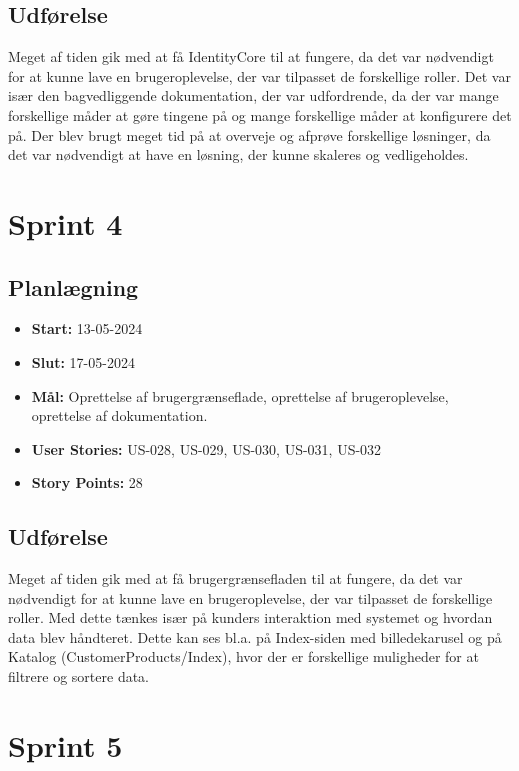 \subsection{Udførelse}
\label{subsec:sprint-3-udforelse}
Meget af tiden gik med at få IdentityCore til at fungere, da det var nødvendigt for at kunne lave en brugeroplevelse, der var tilpasset de forskellige roller.
Det var især den bagvedliggende dokumentation, der var udfordrende, da der var mange forskellige måder at gøre tingene på og mange forskellige måder at konfigurere det på.
Der blev brugt meget tid på at overveje og afprøve forskellige løsninger, da det var nødvendigt at have en løsning, der kunne skaleres og vedligeholdes.

\section{Sprint 4}
\label{sec:sprint-4}
\subsection{Planlægning}
\label{subsec:sprint-4-plan}
\begin{itemize}
    \item \textbf{Start:} 13-05-2024
    \item \textbf{Slut:} 17-05-2024
    \item \textbf{Mål:} Oprettelse af brugergrænseflade, oprettelse af brugeroplevelse, oprettelse af dokumentation.
    \item \textbf{User Stories:} US-028, US-029, US-030, US-031, US-032
    \item \textbf{Story Points:} 28
\end{itemize}

\subsection{Udførelse}
\label{subsec:sprint-4-udforelse}
Meget af tiden gik med at få brugergrænsefladen til at fungere, da det var nødvendigt for at kunne lave en brugeroplevelse, der var tilpasset de forskellige roller.
Med dette tænkes især på kunders interaktion med systemet og hvordan data blev håndteret. 
Dette kan ses bl.a. på Index-siden med billedekarusel og på Katalog (CustomerProducts/Index), hvor der er forskellige muligheder for at filtrere og sortere data.

\section{Sprint 5}
\label{sec:sprint-5}
